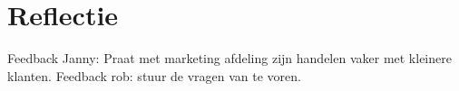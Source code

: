 \chapter{Reflectie}
Feedback Janny: Praat met marketing afdeling zijn handelen vaker met kleinere klanten.
Feedback rob: stuur de vragen van te voren.
